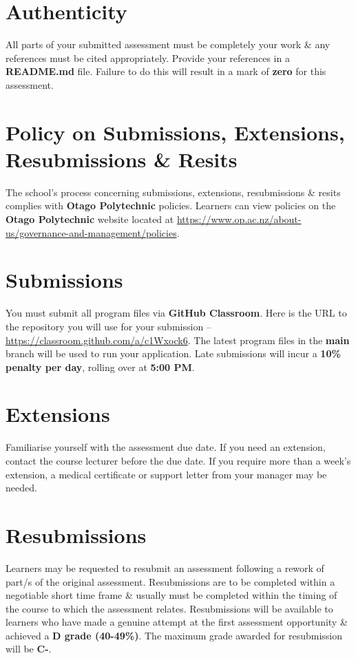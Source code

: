 \documentclass{article}
\begin{document}
\section*{Authenticity}
All parts of your submitted assessment must be completely your work \& any references must be cited appropriately. Provide your references in a \textbf{README.md} file. Failure to do this will result in a mark of \textbf{zero} for this assessment.

\section*{Policy on Submissions, Extensions, Resubmissions \& Resits}
The school's process concerning submissions, extensions, resubmissions \& resits complies with \textbf{Otago Polytechnic} policies. Learners can view policies on the \textbf{Otago Polytechnic} website located at \href{https://www.op.ac.nz/about-us/governance-and-management/policies}{https://www.op.ac.nz/about-us/governance-and-management/policies}.

\section*{Submissions}
You must submit all program files via \textbf{GitHub Classroom}. Here is the URL to the repository you will use for your submission – \href{https://classroom.github.com/a/c1Wxock6}{https://classroom.github.com/a/c1Wxock6}. The latest program files in the \textbf{main} branch will be used to run your application. Late submissions will incur a \textbf{10\% penalty per day}, rolling over at \textbf{5:00 PM}.

\section*{Extensions}
Familiarise yourself with the assessment due date. If you need an extension, contact the course lecturer before the due date. If you require more than a week's extension, a medical certificate or support letter from your manager may be needed.

\section*{Resubmissions}
Learners may be requested to resubmit an assessment following a rework of part/s of the original assessment. Resubmissions are to be completed within a negotiable short time frame \& usually must be completed within the timing of the course to which the assessment relates. Resubmissions will be available to learners who have made a genuine attempt at the first assessment opportunity \& achieved a \textbf{D grade (40-49\%)}. The maximum grade awarded for resubmission will be \textbf{C-}.
\end{document}
